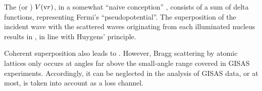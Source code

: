 %
%
%
%
The  (or )
 $V(\text{v}{r})$,
in a somewhat ``naive conception'' \cite[p.~7]{Sea89},
consists of a sum of delta functions,
representing Fermi's ``pseudopotential''.
%
The superposition of the incident wave with the scattered waves
originating from each illuminated nucleus
results in ,
%
in line with Huygens' principle.
%

Coherent superposition also leads to .
%
However, Bragg scattering by atomic lattices only occurs at angles
far above the small-angle range covered in GISAS experiments.
Accordingly, it can be neglected in the analysis of GISAS data,
or at most, is taken into account as a loss channel.

